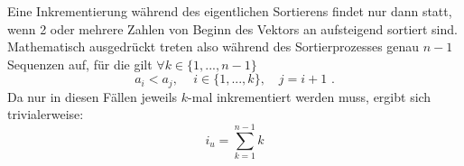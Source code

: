 \documentclass[11pt]{article}
\theoremstyle{plain}
\theoremstyle{definition}
\renewcommand{\a}{\"{a}}
\renewcommand{\u}{\"{u}}
\begin{document}
\begin{itemize}
Eine Inkrementierung w\a hrend des eigentlichen Sortierens findet nur dann statt, wenn 2 oder mehrere Zahlen von Beginn des Vektors an aufsteigend sortiert sind. Mathematisch ausgedr\u ckt treten also w\a hrend des Sortierprozesses genau $n-1$ Sequenzen auf, f\u r die gilt $\forall k\in \{1,...,n-1\}$
\begin{equation}
a_i < a_j, \quad \, i\in\{1,...,k\},\quad j=i+1 \text{ .}
\end{equation}
Da nur in diesen F\a llen jeweils $k$-mal inkrementiert werden muss, ergibt sich trivialerweise:
\begin{equation}
i_u = \sum_{k=1}^{n-1} k
\end{equation}

\end{itemize}
 
\end{document}
